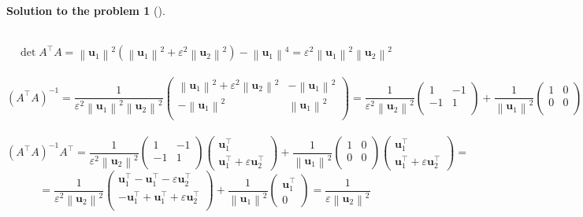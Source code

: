 \documentclass[12pt,a4]{article}
\newtheorem{solution}{Solution to the problem}
\newcommand{\bu}{{\mathbf u}}
\newcommand{\norm}[1]{\left\lVert#1\right\rVert}
\begin{document}
\begin{solution}[]
\begin{enumerate}[(a)]
\[\]\\
\[
\det{A^\top A} = \norm{\bu_1}^2 (\norm{\bu_1}^2  + \varepsilon^2 \norm{\bu_2}^2) - \norm{\bu_1}^4 = \varepsilon^2 \norm{\bu_1}^2 \norm{\bu_2}^2
\]\\
\[
(A^\top A)^{-1} =
\frac{1}{\varepsilon^2 \norm{\bu_1}^2 \norm{\bu_2}^2}
\begin{pmatrix} 
\norm{\bu_1}^2  + \varepsilon^2 \norm{\bu_2}^2 &  -\norm{\bu_1}^2 \\
-\norm{\bu_1}^2 & \norm{\bu_1}^2 \\
\end{pmatrix}
=
\frac{1}{\varepsilon^2\norm{\bu_2}^2}
\begin{pmatrix} 
1 &  -1 \\
-1 & 1 \\
\end{pmatrix}
+
\frac{1}{\norm{\bu_1}^2}
\begin{pmatrix} 
1 &  0 \\
0 & 0 \\
\end{pmatrix}
\]\\
\[
(A^\top A)^{-1}A^\top 
=
\frac{1}{\varepsilon^2\norm{\bu_2}^2}
\begin{pmatrix} 
1 &  -1 \\
-1 & 1 \\
\end{pmatrix}
\begin{pmatrix} 
\bu_1^\top \\ \bu_1^\top+\varepsilon\bu_2^\top
\end{pmatrix}
+
\frac{1}{\norm{\bu_1}^2}
\begin{pmatrix} 
1 &  0 \\
0 & 0 \\
\end{pmatrix}
\begin{pmatrix} 
\bu_1^\top \\ \bu_1^\top+\varepsilon\bu_2^\top
\end{pmatrix}
=
\]
\[
=
\frac{1}{\varepsilon^2\norm{\bu_2}^2}
\begin{pmatrix} 
\bu_1^\top - \bu_1^\top - \varepsilon\bu_2^\top \\
-\bu_1^\top + \bu_1^\top + \varepsilon\bu_2^\top \\
\end{pmatrix}
+
\frac{1}{\norm{\bu_1}^2}
\begin{pmatrix} 
\bu_1^\top \\ 0
\end{pmatrix}
=
\frac{1}{\varepsilon\norm{\bu_2}^2}
\]
\end{enumerate}
\end{solution}
\end{document}
